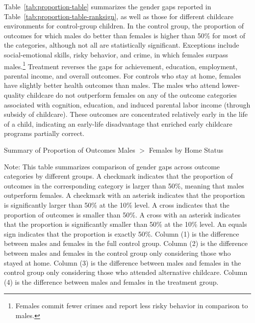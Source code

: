 Table~\ref{tab:proportion-table} summarizes the gender gaps reported in Table~\ref{tab:proportion-table-ranksign}, as well as those for different childcare environments for control-group children. In the control group, the proportion of outcomes for which males do better than females is higher than 50\% for most of the categories, although not all are statistically significant. Exceptions include social-emotional skills, risky behavior, and crime, in which females surpass males.\footnote{Females commit fewer crimes and report less risky behavior in comparison to males.} Treatment reverses the gaps for achievement, education, employment, parental income, and overall outcomes. For controls who stay at home, females have slightly better health outcomes than males. The males who attend lower-quality childcare do not outperform females on any of the outcome categories associated with cognition, education, and induced parental labor income (through subsidy of childcare). These outcomes are concentrated relatively early in the life of a child, indicating an early-life disadvantage that enriched early childcare programs partially correct.

\begin{table}[H]
\centering
\caption{Summary of Proportion of Outcomes Males $>$ Females by Home Status}
\label{tab:proportion-table}
\begin{threeparttable}
\begin{footnotesize}

\end{footnotesize}
\begin{tablenotes}
\footnotesize
\item Note: This table summarizes comparison of gender gaps across outcome categories by different groups. A checkmark indicates that the proportion of outcomes in the corresponding category is larger than 50\%, meaning that males outperform females. A checkmark with an asterisk indicates that the proportion is significantly larger than 50\% at the 10\% level. A cross indicates that the proportion of outcomes is smaller than 50\%. A cross with an asterisk indicates that the proportion is significantly smaller than 50\% at the 10\% level. An equals sign indicates that the proportion is exactly 50\%. Column (1) is the difference between males and females in the full control group.  Column (2) is the difference between males and females in the control group only considering those who stayed at home. Column (3) is the difference between males and females in the control group only considering those who attended alternative childcare. Column (4) is the difference between males and females in the treatment group.
\end{tablenotes}
\end{threeparttable}
\end{table}

